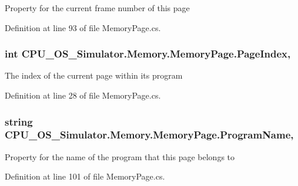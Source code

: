 Property for the current frame number of this page 



Definition at line 93 of file Memory\+Page.\+cs.

\hypertarget{class_c_p_u___o_s___simulator_1_1_memory_1_1_memory_page_aec80700d036a447e7e6ec204513e3a59}{}
\subsubsection[{Page\+Index}]{\setlength{\rightskip}{0pt plus 5cm}int C\+P\+U\+\_\+\+O\+S\+\_\+\+Simulator.\+Memory.\+Memory\+Page.\+Page\+Index\hspace{0.3cm}{\ttfamily [get]}, {\ttfamily [set]}}\label{class_c_p_u___o_s___simulator_1_1_memory_1_1_memory_page_aec80700d036a447e7e6ec204513e3a59}


The index of the current page within its program 



Definition at line 28 of file Memory\+Page.\+cs.

\hypertarget{class_c_p_u___o_s___simulator_1_1_memory_1_1_memory_page_a22a8274576829c0a4e769189a8d10a9e}{}
\subsubsection[{Program\+Name}]{\setlength{\rightskip}{0pt plus 5cm}string C\+P\+U\+\_\+\+O\+S\+\_\+\+Simulator.\+Memory.\+Memory\+Page.\+Program\+Name\hspace{0.3cm}{\ttfamily [get]}, {\ttfamily [set]}}\label{class_c_p_u___o_s___simulator_1_1_memory_1_1_memory_page_a22a8274576829c0a4e769189a8d10a9e}


Property for the name of the program that this page belongs to 



Definition at line 101 of file Memory\+Page.\+cs.

